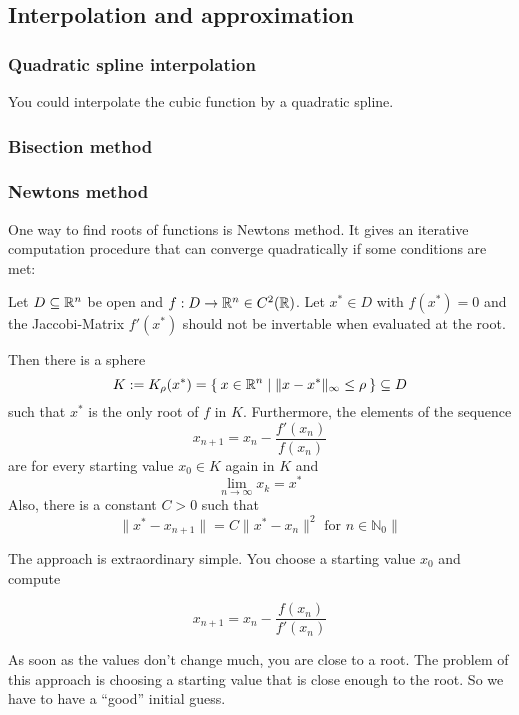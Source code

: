 \subsection{Interpolation and approximation}
\subsubsection{Quadratic spline interpolation}
You could interpolate the cubic function by a quadratic spline.

\subsubsection{Bisection method}

\subsubsection{Newtons method}
One way to find roots of functions is Newtons method. It gives an
iterative computation procedure that can converge quadratically 
if some conditions are met:

\begin{theorem}
    Let $D \subseteq \mathbb{R}^n$ be open and $f: D \rightarrow \mathbb{R}^n \in C^2(\mathbb{R})$.
    Let $x^* \in D$ with $f(x^*) = 0$ and the Jaccobi-Matrix $f'(x^*)$
    should not be invertable when evaluated at the root.

    Then there is a sphere 
    \[K := K_\rho(x^*) = \Set{x \in \ensuremath{\mathbb{R}}^n | \|x- x^*\|_\infty \leq \rho} \subseteq D\]
    such that $x^*$ is the only root of $f$ in $K$. Furthermore,
    the elements of the sequence
    \[ x_{n+1} = x_n - \frac{f'(x_n)}{f(x_n)}\]
    are for every starting value $x_0 \in K$ again in $K$ and
    \[\lim_{n \rightarrow \infty} x_k = x^*\]
    Also, there is a constant $C > 0$ such that
    \[\|x^* - x_{n+1} \| = C \|x^* - x_n\|^2 \text{ for } n \in \mathbb{N}_0\|\]
\end{theorem}

The approach is extraordinary simple. You choose a starting value
$x_0$ and compute

\[x_{n+1} = x_n - \frac{f(x_n)}{f'(x_n)}\]

As soon as the values don't change much, you are close to a root.
The problem of this approach is choosing a starting value that is
close enough to the root. So we have to have a \enquote{good}
initial guess.
\clearpage

